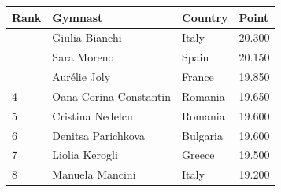 \documentclass{article}
\begin{document}
\begin{tabular}{llll}
\toprule
Rank & Gymnast & Country & Point \\
\midrule
 & Giulia Bianchi & Italy & 20.300 \\
 & Sara Moreno & Spain & 20.150 \\
 & Aurélie Joly & France & 19.850 \\
4 & Oana Corina Constantin & Romania & 19.650 \\
5 & Cristina Nedelcu & Romania & 19.600 \\
6 & Denitsa Parichkova & Bulgaria & 19.600 \\
7 & Liolia Kerogli & Greece & 19.500 \\
8 & Manuela Mancini & Italy & 19.200 \\
\bottomrule
\end{tabular}
\end{document}
